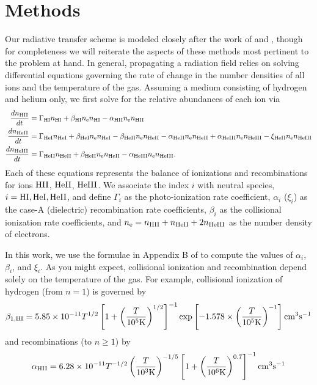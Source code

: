 \documentclass[letterpaper,titlepage,12pt]{article}
\numberwithin{equation}{section}
\begin{document}
\section{Methods}
Our radiative transfer scheme is modeled closely after the work of
\cite{Fukugita1994} and \cite{Thomas2008}, though for completeness we will
reiterate the aspects of these methods most pertinent to the problem at hand.
In general, propagating a radiation field relies on solving differential
equations governing the rate of change in the number densities of all ions and
the temperature of the gas. Assuming a medium consisting of hydrogen and
helium only, we first solve for the relative abundances of each ion via
\begin{align}
    \frac{d n_{\text{HII}}}{dt} & = \Gamma_{\text{HI}} n_{\text{HI}} + \beta_{\text{HI}} n_{\text{e}} n_{\text{HI}} - \alpha_{\text{HII}} n_{\text{e}} n_{\text{HII}}   \label{eq:HIIRateEquation} \\ 
    \frac{d n_{\text{HeII}}}{dt} & = \Gamma_{\text{HeI}} n_{\text{HeI}} + \beta_{\text{HeI}} n_{\text{e}} n_{\text{HeI}} - \beta_{\text{HeII}} n_{\text{e}} n_{\text{HeII}} - \alpha_{\text{HeII}} n_{\text{e}} n_{\text{HeII}} + \alpha_{\text{HeIII}} n_{\text{e}} n_{\text{HeIII}} - \xi_{\text{HeII}} n_{\text{e}} n_{\text{HeIII}}  \label{eq:HeIIRateEquation} \\ 
    \frac{d n_{\text{HeIII}}}{dt} & = \Gamma_{\text{HeII}} n_{\text{HeII}} + \beta_{\text{HeII}} n_{\text{e}} n_{\text{HeII}} - \alpha_{\text{HeIII}} n_{\text{e}} n_{\text{HeIII}} . \label{eq:HeIIIRateEquation}
\end{align}
Each of these equations represents the balance of ionizations and
recombinations for ions $\text{HII}$, $\text{HeII}$, $\text{HeIII}$. We associate the index $i$
with neutral species, $i = \text{HI}, \text{HeI}, \text{HeII}$, and define $\Gamma_i$ as the
photo-ionization rate coefficient, $\alpha_i$ ($\xi_i$) as the case-A
(dielectric) recombination rate coefficients, $\beta_i$ as the collisional
ionization rate coefficients, and $n_{\text{e}} = n_{\text{HII}} + n_{\text{HeII}} + 2n_{\text{HeIII}}$ as the number density of electrons.

In this work, we use the formulae in Appendix B of \cite{Fukugita1994} to
compute the values of $\alpha_i$, $\beta_i$, and $\xi_i$. As you might expect, collisional ionization and recombination depend solely on the temperature of the gas.  For example, collisional ionization of hydrogen (from $n = 1$) is governed by
\begin{equation}
    \beta_{1,\text{HI}} = 5.85 \times 10^{-11} T^{1/2} \left[1 + \left(\frac{T}{10^5 \mathrm{K}}\right)^{1/2}\right]^{-1} \mathrm{exp}\left[-1.578 \times \left(\frac{T}{10^5 \mathrm{K}}\right)^{-1}\right] \mathrm{cm^3 s^{-1}}
\end{equation}
and recombinations (to $n \ge 1$) by
\begin{equation}
    \alpha_{\text{HII}} = 6.28 \times 10^{-11} T^{-1/2} \left(\frac{T}{10^3\mathrm{K}}\right)^{-1/5} \left[1 + \left(\frac{T}{10^6\mathrm{K}}\right)^{0.7}\right]^{-1} \mathrm{cm^3s^{-1}}
\end{equation}
\end{document}
